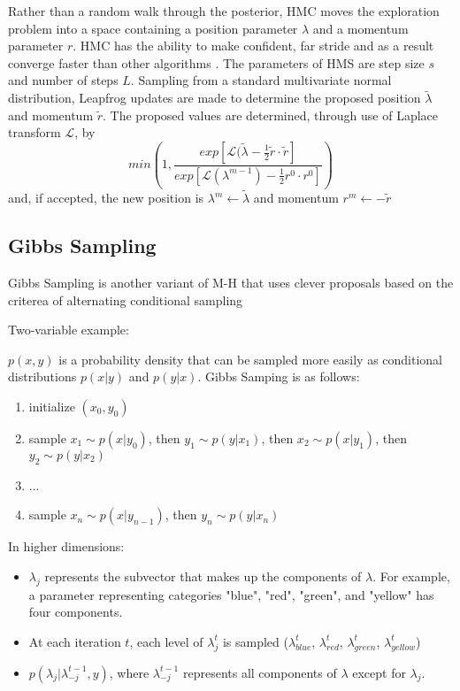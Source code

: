 Rather than a random walk through the posterior, HMC moves the exploration problem into a space containing a position parameter $\lambda$ and a momentum parameter $r$.  HMC has the ability to make confident, far stride and as a result converge faster than other algorithms \cite{mullachery2018bayesian}.
The parameters of HMS are step size $s$ and number of steps $L$. Sampling from a standard multivariate normal distribution, Leapfrog updates are made to determine the proposed position $\tilde{\lambda}$ and momentum $\tilde{r}$.  The proposed values are determined, through use of Laplace transform $\mathcal{L}$, by
$$
min\left( 1, \frac{exp[\mathcal{L}(\tilde{\lambda} - \frac{1}{2} \tilde{r} \cdot \tilde{r}]}
{exp[\mathcal{L}(\lambda^{m-1}) - \frac{1}{2} r^0 \cdot r^0] }
\right)
$$
and, if accepted, the new position is $\lambda^m \leftarrow \tilde{\lambda}$ and momentum $r^m \leftarrow -\tilde{r}$

\subsection{Gibbs Sampling}

Gibbs Sampling is another variant of M-H that uses clever proposals based on the criterea of alternating conditional sampling

Two-variable example: \cite{geman1984stochastic}  

$p(x,y)$ is a probability density that can be sampled more easily as conditional distributions $p(x|y)$ and $p(y|x)$.  Gibbs Samping is as follows:
\begin{enumerate}
\item{initialize $(x_0,y_0)$}
\item{sample $x_1 \sim p(x|y_0)$, then $y_1 \sim p(y|x_1)$, then $x_2 \sim p(x|y_1)$, then $y_2 \sim p(y|x_2)$}
\item{ ...}
\item{sample $x_n \sim p(x|y_{n-1})$, then $y_n \sim p(y|x_n)$}
\end{enumerate}

In higher dimensions:

\begin{itemize}
\tightlist
\item{$\lambda_j$ represents the subvector that makes up the components of $\lambda$.  For example, a parameter representing categories "blue", "red", "green", and "yellow" has four components.}
\item{At each iteration $t$, each level of $\lambda^t_j$ is sampled ($\lambda^t_{blue}$, $\lambda^t_{red}$, $\lambda^t_{green}$, $\lambda^t_{yellow}$)}
\item{ $p(\lambda_j|\lambda^{t-1}_{-j},y)$, where $\lambda^{t-1}_{-j}$ represents all components of $\lambda$ except for $\lambda_j$.}
\end{itemize}



